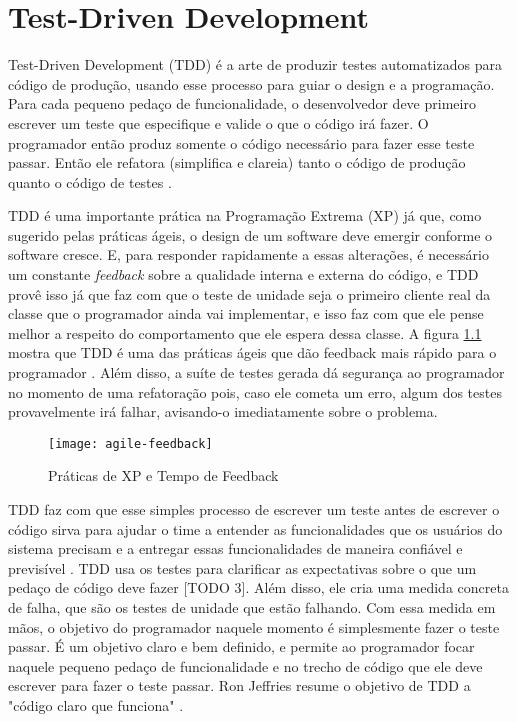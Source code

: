 \chapter{Test-Driven Development}
\label{cap:tdd}

Test-Driven Development (TDD) é a arte de produzir testes automatizados para código de produção, usando
esse processo para guiar o design e a programação. Para cada pequeno pedaço de funcionalidade, o desenvolvedor
deve primeiro escrever um teste que especifique e valide o que o código irá fazer. O programador então produz
somente o código necessário para fazer esse teste passar. Então ele refatora (simplifica e clareia) tanto o
código de produção quanto o código de testes \cite{agilealliance-tdd} \cite{tdd-taxonomy}.

TDD é uma importante prática na Programação Extrema (XP) \cite{XPExplained} já que, como sugerido pelas práticas
ágeis, o design de um software deve emergir conforme o software cresce. E, para responder rapidamente a essas
alterações, é necessário um constante \textit{feedback} sobre a qualidade interna e externa do código, e TDD
provê isso já que faz com que o teste de unidade seja o primeiro cliente real da classe que o programador ainda
vai implementar, e isso faz com que ele pense melhor a respeito do comportamento que ele espera dessa classe. 
A figura \ref{fig:agile-feedback} mostra
que TDD é uma das práticas ágeis que dão feedback mais rápido para o programador \cite{vanderburg}.
Além disso,
a suíte de testes gerada dá segurança ao programador no momento de uma refatoração pois, caso ele cometa um erro,
algum dos testes provavelmente irá falhar, avisando-o imediatamente sobre o problema. 

\begin{figure}
  \centering
  \texttt{[image: agile-feedback]}
  \caption{Práticas de XP e Tempo de Feedback}
  \label{fig:agile-feedback}
\end{figure}


TDD faz com que esse simples processo de escrever um teste antes de escrever o código
sirva para ajudar o time a entender as funcionalidades que os usuários do sistema precisam e 
a entregar essas funcionalidades de maneira confiável e previsível \cite{GOOS}. TDD usa os testes para clarificar as expectativas
sobre o que um pedaço de código deve fazer [TODO 3]. Além disso, ele cria uma medida concreta de falha, que são os testes de 
unidade que estão falhando. Com essa medida em mãos, o objetivo do programador naquele momento é simplesmente fazer o teste passar. É um
objetivo claro e bem definido, e permite ao programador focar naquele pequeno pedaço de funcionalidade e no trecho de código que ele 
deve escrever para fazer o teste passar. Ron Jeffries resume o objetivo de TDD a "código claro que funciona" \cite{TDDByExample}. 

